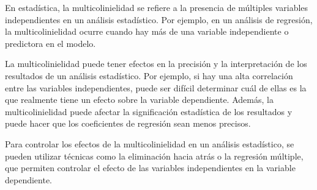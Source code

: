 \documentclass{article}
\begin{document}
En estadística, la multicolinielidad se refiere a la presencia de múltiples variables independientes en un análisis estadístico. Por ejemplo, en un análisis de regresión, la multicolinielidad ocurre cuando hay más de una variable independiente o predictora en el modelo.

La multicolinielidad puede tener efectos en la precisión y la interpretación de los resultados de un análisis estadístico. Por ejemplo, si hay una alta correlación entre las variables independientes, puede ser difícil determinar cuál de ellas es la que realmente tiene un efecto sobre la variable dependiente. Además, la multicolinielidad puede afectar la significación estadística de los resultados y puede hacer que los coeficientes de regresión sean menos precisos.

Para controlar los efectos de la multicolinielidad en un análisis estadístico, se pueden utilizar técnicas como la eliminación hacia atrás o la regresión múltiple, que permiten controlar el efecto de las variables independientes en la variable dependiente.
\end{document}
